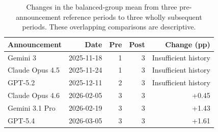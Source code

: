 \begin{table}[H]
\centering
\small
\caption{Changes in the balanced-group mean from three pre-announcement reference periods to three wholly subsequent periods. These overlapping comparisons are descriptive.}\label{tab:events}
\begin{tabular}{lrrrr}
\toprule
Announcement & Date & Pre & Post & Change (pp) \\
\midrule
Gemini 3 & 2025-11-18 & 1 & 3 & Insufficient history \\
Claude Opus 4.5 & 2025-11-24 & 1 & 3 & Insufficient history \\
GPT-5.2 & 2025-12-11 & 2 & 3 & Insufficient history \\
Claude Opus 4.6 & 2026-02-05 & 3 & 3 & +0.45 \\
Gemini 3.1 Pro & 2026-02-19 & 3 & 3 & +1.43 \\
GPT-5.4 & 2026-03-05 & 3 & 3 & +1.61 \\
\bottomrule
\end{tabular}
\end{table}
